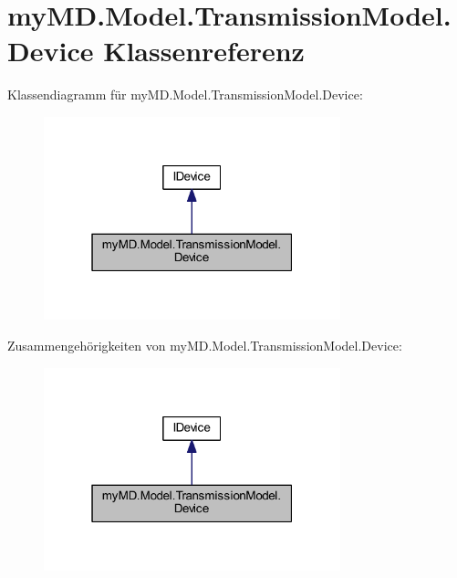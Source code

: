 \hypertarget{classmy_m_d_1_1_model_1_1_transmission_model_1_1_device}{}\section{my\+M\+D.\+Model.\+Transmission\+Model.\+Device Klassenreferenz}
\label{classmy_m_d_1_1_model_1_1_transmission_model_1_1_device}


Klassendiagramm für my\+M\+D.\+Model.\+Transmission\+Model.\+Device\+:\nopagebreak
\begin{figure}[H]
\begin{center}
\leavevmode
\includegraphics[width=244pt]{classmy_m_d_1_1_model_1_1_transmission_model_1_1_device__inherit__graph}
\end{center}
\end{figure}


Zusammengehörigkeiten von my\+M\+D.\+Model.\+Transmission\+Model.\+Device\+:\nopagebreak
\begin{figure}[H]
\begin{center}
\leavevmode
\includegraphics[width=244pt]{classmy_m_d_1_1_model_1_1_transmission_model_1_1_device__coll__graph}
\end{center}
\end{figure}
